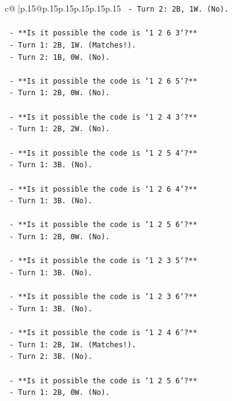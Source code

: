 \documentclass{article}
\begin{document}
{\begin{supertabular}{c@{$\;$}|p{.15\linewidth}@{}p{.15\linewidth}p{.15\linewidth}p{.15\linewidth}p{.15\linewidth}p{.15\linewidth}}
{{{\texttt{        {-} Turn 2: 2B, 1W. (No).} \\
\\ 
\texttt{    {-} **Is it possible the code is `1 2 6 3`?**} \\
\texttt{        {-} Turn 1: 2B, 1W. (Matches!).} \\
\texttt{        {-} Turn 2: 1B, 0W. (No).} \\
\\ 
\texttt{    {-} **Is it possible the code is `1 2 6 5`?**} \\
\texttt{        {-} Turn 1: 2B, 0W. (No).} \\
\\ 
\texttt{    {-} **Is it possible the code is `1 2 4 3`?**} \\
\texttt{        {-} Turn 1: 2B, 2W. (No).} \\
\\ 
\texttt{    {-} **Is it possible the code is `1 2 5 4`?**} \\
\texttt{        {-} Turn 1: 3B. (No).} \\
\\ 
\texttt{    {-} **Is it possible the code is `1 2 6 4`?**} \\
\texttt{        {-} Turn 1: 3B. (No).} \\
\\ 
\texttt{    {-} **Is it possible the code is `1 2 5 6`?**} \\
\texttt{        {-} Turn 1: 2B, 0W. (No).} \\
\\ 
\texttt{    {-} **Is it possible the code is `1 2 3 5`?**} \\
\texttt{        {-} Turn 1: 3B. (No).} \\
\\ 
\texttt{    {-} **Is it possible the code is `1 2 3 6`?**} \\
\texttt{        {-} Turn 1: 3B. (No).} \\
\\ 
\texttt{    {-} **Is it possible the code is `1 2 4 6`?**} \\
\texttt{        {-} Turn 1: 2B, 1W. (Matches!).} \\
\texttt{        {-} Turn 2: 3B. (No).} \\
\\ 
\texttt{    {-} **Is it possible the code is `1 2 5 6`?**} \\
\texttt{        {-} Turn 1: 2B, 0W. (No).} \\
\\ 
}}}
\end{supertabular}}
\end{document}
